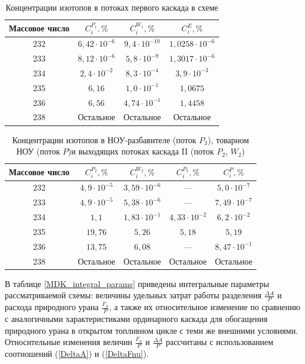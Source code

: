 \begin{table}[ht]
    \centering
    \caption{Концентрации изотопов в потоках первого каскада в схеме}\label{MDKcas1params}
    \begin{tabular}{|c|c|c|c|}
        \hline Массовое число & $C_{i}^{P_{1}}, \%$ & $C_{i}^{W_{1}}, \%$ & $C_{i}^{E}, \%$\\\hline 
        232 & $6,42\cdot10^{-6}$ & $9,4\cdot10^{-10}$ & $1,0258\cdot10^{-6}$\\
        233 & $8,12\cdot10^{-6}$ & $5,8\cdot10^{-9}$ & $1,3017\cdot10^{-6}$\\
        234 & $2,4\cdot10^{-2}$ & $8,3\cdot10^{-4}$ & $3,9\cdot10^{-3}$\\
        235 & $6,16$ & $1,0\cdot10^{-1}$ & $1,0675$\\
        236 & $6,56$ & $4,74\cdot10^{-1}$ & $1,4458$\\
        238 & Остальное & Остальное & Остальное\\
        \hline
    \end{tabular}
\end{table}

\begin{table}[ht]
    \centering
    \caption{Концентрации изотопов в НОУ-разбавителе (поток $P_{3}$), товарном НОУ (поток $P$)и выходящих потоках каскада II (поток $P_{2}$, $W_{2}$)}\label{MDKcas2params}
    \begin{tabular}{|c|c|c|c|c|}
        \hline Массовое число & $C_{i}^{P_{2}}, \%$ & $C_{i}^{W_{2}}, \%$ & $C_{i}^{P_{3}}, \%$ & $C_{i}^{P}, \%$\\
        \hline 232 & $4,9\cdot10^{-5}$ & $3,59\cdot10^{-6}$ & --- & $5,0\cdot10^{-7}$\\
        233 & $4,9\cdot10^{-5}$ & $5,38\cdot10^{-6}$ & --- & $7,49\cdot10^{-7}$\\
        234 & $1,1$ & $1,83\cdot10^{-1}$ & $4,33\cdot10^{-2}$ & $6,2\cdot10^{-2}$\\
        235 & $19,76$ & $5,26$ & $5,18$  & $5,19$\\
        236 & $13,75$ & $6,08$ & ---  & $8,47\cdot10^{-1}$\\
        238 & Остальное & Остальное & Остальное  & Остальное\\
        \hline
\end{tabular}
\end{table}

В таблице \ref{MDK_integral_params} приведены интегральные параметры рассматриваемой схемы: величины удельных затрат работы разделения $\frac{\Delta A}{P}$ и расхода природного урана $\frac{F_n}{P}$, а также их относительное изменение по сравнению с аналогичными характеристиками ординарного каскада для обогащения природного урана в открытом топливном цикле с теми же внешними условиями. Относительные изменения величин $\frac{F_n}{P}$ и $\frac{\Delta A}{P}$ рассчитаны с использованием соотношений (\ref{DeltaA}) и (\ref{DeltaFnu}).

